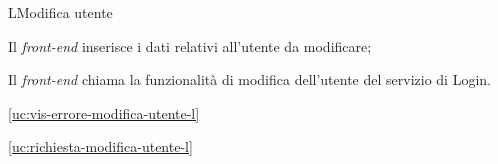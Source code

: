 \begin{usecase}{4}{L}{Modifica utente}



	\begin{ucscenarioprincipale}
		\item Il \textit{front-end} inserisce i dati relativi all'utente da modificare;
		\item Il \textit{front-end} chiama la funzionalità di modifica dell'utente del servizio di Login.
	\end{ucscenarioprincipale}


	\begin{ucestensioni}
		\item \ref{uc:vis-errore-modifica-utente-l}
	\end{ucestensioni}

	\begin{ucgeneralizzazioni}
		\item \ref{uc:richiesta-modifica-utente-l}
	\end{ucgeneralizzazioni}

	\label{uc:modifica-utente-l}
\end{usecase}

